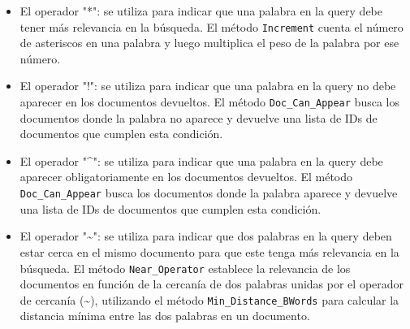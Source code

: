 \documentclass{article}
\begin{document}
\begin{itemize}
\item El operador "*": se utiliza para indicar que una palabra en la query debe tener más relevancia en la búsqueda. El método \texttt{Increment} cuenta el número de asteriscos en una palabra y luego multiplica el peso de la palabra por ese número.

\item El operador "!": se utiliza para indicar que una palabra en la query no debe aparecer en los documentos devueltos. El método \texttt{Doc\_Can\_Appear} busca los documentos donde la palabra no aparece y devuelve una lista de IDs de documentos que cumplen esta condición.

\item El operador "\^{}": se utiliza para indicar que una palabra en la query debe aparecer obligatoriamente en los documentos devueltos. El método \texttt{Doc\_Can\_Appear} busca los documentos donde la palabra aparece y devuelve una lista de IDs de documentos que cumplen esta condición.

\item El operador "\~{}": se utiliza para indicar que dos palabras en la query deben estar cerca en el mismo documento para que este tenga más relevancia en la búsqueda. El método \texttt{Near\_Operator} establece la relevancia de los documentos en función de la cercanía de dos palabras unidas por el operador de cercanía (\~{}), utilizando el método \texttt{Min\_Distance\_BWords} para calcular la distancia mínima entre las dos palabras en un documento.
\end{itemize}
\end{document}
